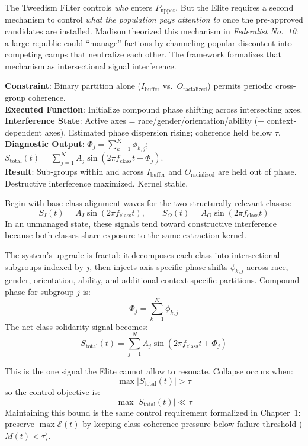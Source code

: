 \documentclass[12pt,openany]{book}
\begin{document}
The Tweedism Filter controls \textit{who} enters $P_{\text{uppet}}$. But the Elite requires a second mechanism to control \textit{what the population pays attention to} once the pre-approved candidates are installed. Madison theorized this mechanism in \textit{Federalist No.~10}: a large republic could ``manage'' factions by channeling popular discontent into competing camps that neutralize each other. The framework formalizes that mechanism as intersectional signal interference.

\begin{tcolorbox}[colback=black!5, colframe=black!70, fonttitle=\bfseries\ttfamily, title=RUNTIME LOG: v5.0 (FRACTAL INTERFERENCE ENGINE)]
\ttfamily\small
\textbf{Constraint}: Binary partition alone ($I_{\text{buffer}}$ vs.\ $O_{\text{racialized}}$) permits periodic cross-group coherence.\\
\textbf{Executed Function}: Initialize compound phase shifting across intersecting axes.\\
\textbf{Interference State}: Active axes = race/gender/orientation/ability (+ context-dependent axes). Estimated phase dispersion rising; coherence held below $\tau$.\\
\textbf{Diagnostic Output}: $\Phi_j = \sum_{k=1}^{K}\phi_{k,j}$; $S_{\text{total}}(t)=\sum_{j=1}^{N}A_j\sin(2\pi f_{\text{class}} t+\Phi_j)$.\\
\textbf{Result}: Sub-groups within and across $I_{\text{buffer}}$ and $O_{\text{racialized}}$ are held out of phase. Destructive interference maximized. Kernel stable.
\end{tcolorbox}

\medskip

Begin with base class-alignment waves for the two structurally relevant classes:
\[
S_{I}(t)=A_I\sin(2\pi f_{\text{class}} t), \qquad
S_{O}(t)=A_O\sin(2\pi f_{\text{class}} t)
\]
In an unmanaged state, these signals tend toward constructive interference because both classes share exposure to the same extraction kernel.

The system's upgrade is fractal: it decomposes each class into intersectional subgroups indexed by $j$, then injects axis-specific phase shifts $\phi_{k,j}$ across race, gender, orientation, ability, and additional context-specific partitions. Compound phase for subgroup $j$ is:
\[
\Phi_j=\sum_{k=1}^{K}\phi_{k,j}
\]
The net class-solidarity signal becomes:
\[
S_{\text{total}}(t)=\sum_{j=1}^{N}A_j\sin(2\pi f_{\text{class}} t+\Phi_j)
\]

This is the one signal the Elite cannot allow to resonate. Collapse occurs when:
\[
\max\left|S_{\text{total}}(t)\right|>\tau
\]
so the control objective is:
\[
\max\left|S_{\text{total}}(t)\right| \ll \tau
\]
Maintaining this bound is the same control requirement formalized in Chapter~1: preserve $\max \mathcal{E}(t)$ by keeping class-coherence pressure below failure threshold ($M(t)<\tau$).
\end{document}

